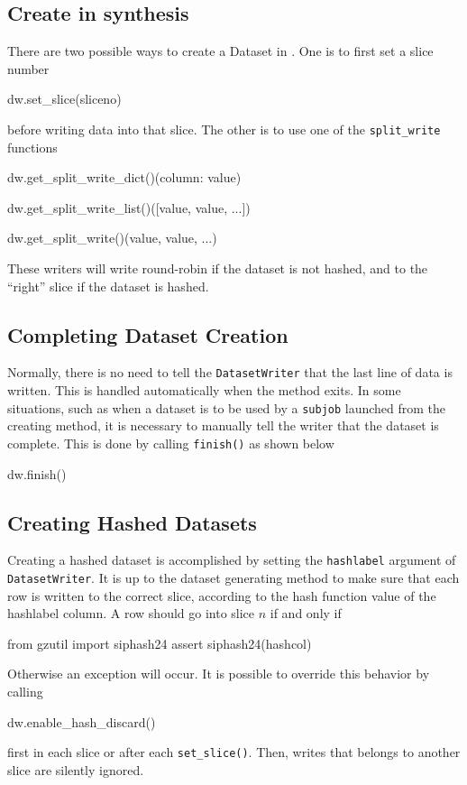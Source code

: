 \subsection{Create in synthesis}

There are two possible ways to create a Dataset in \synthesis.  One is
to first set a slice number
\begin{python}
dw.set_slice(sliceno)
\end{python}
before writing data into that slice.  The other is to use one of
the \texttt{split\_write} functions
\begin{python}
dw.get_split_write_dict()({column: value})

dw.get_split_write_list()([value, value, ...])

dw.get_split_write()(value, value, ...)
\end{python}
These writers will write round-robin if the dataset is not hashed, and
to the ``right'' slice if the dataset is hashed.



\subsection{Completing Dataset Creation}
Normally, there is no need to tell the \texttt{DatasetWriter} that the
last line of data is written.  This is handled automatically when the
method exits.  In some situations, such as when a dataset is to be
used by a \texttt{subjob} launched from the creating method, it is
necessary to manually tell the writer that the dataset is complete.
This is done by calling \texttt{finish()} as shown below
\begin{python}
dw.finish()
\end{python}



\subsection{Creating Hashed Datasets}
Creating a hashed dataset is accomplished by setting
the \texttt{hashlabel} argument of \texttt{DatasetWriter}.  It is up
to the dataset generating method to make sure that each row is written
to the correct slice, according to the hash function value of the
hashlabel column.  A row should go into slice $n$ if and only if
\begin{python}
from gzutil import siphash24
assert siphash24(hashcol) %
\end{python}
Otherwise an exception will occur.  It is possible to override this
behavior by calling
\begin{python}
dw.enable_hash_discard()
\end{python}
first in each slice or after each \texttt{set\_slice()}.  Then, writes
that belongs to another slice are silently ignored.




